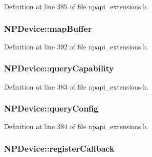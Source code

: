 Definition at line 385 of file npapi\_\-extensions.h.

\hypertarget{struct_n_p_device_a90bcf80db7548761df5e9688747c1e5f}{
\subsubsection[{mapBuffer}]{ {\bf NPDevice::mapBuffer}}}
\label{struct_n_p_device_a90bcf80db7548761df5e9688747c1e5f}


Definition at line 392 of file npapi\_\-extensions.h.

\hypertarget{struct_n_p_device_ae8f9e9b905ed833cbd2fd0c23d9a9b2b}{
\subsubsection[{queryCapability}]{ {\bf NPDevice::queryCapability}}}
\label{struct_n_p_device_ae8f9e9b905ed833cbd2fd0c23d9a9b2b}


Definition at line 383 of file npapi\_\-extensions.h.

\hypertarget{struct_n_p_device_af7a4897fbaa468bafc56ec99883dd0e8}{
\subsubsection[{queryConfig}]{ {\bf NPDevice::queryConfig}}}
\label{struct_n_p_device_af7a4897fbaa468bafc56ec99883dd0e8}


Definition at line 384 of file npapi\_\-extensions.h.

\hypertarget{struct_n_p_device_aa90f4b508a73bcea3589b47df92f5b47}{
\subsubsection[{registerCallback}]{ {\bf NPDevice::registerCallback}}}
\label{struct_n_p_device_aa90f4b508a73bcea3589b47df92f5b47}


